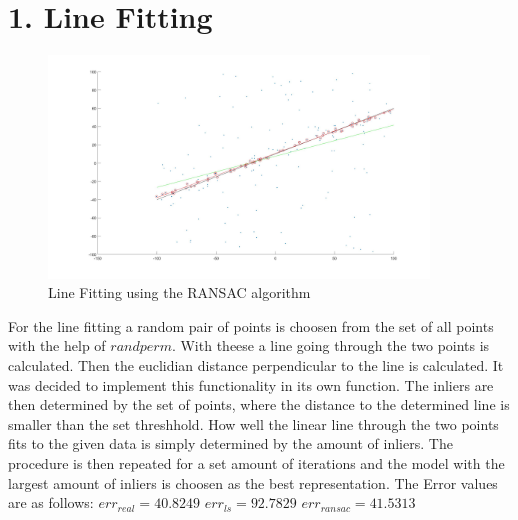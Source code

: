 \documentclass[12pt]{article}
\begin{document}
\maketitle


\section{1. Line Fitting}

\vspace{5mm}
\newline
\begin{figure}[ht]
	\centering
	\includegraphics[width=0.9\textwidth]{ransac.jpg}
	\caption{Line Fitting using the RANSAC algorithm}
	\label{fig1}
\end{figure}
\vspace{5mm}
\newline

For the line fitting a random pair of points is choosen from the set of all points with the help of $randperm$. With theese a line going through the two points is calculated. 
\newline
Then the euclidian distance perpendicular to the line is calculated. It was decided to implement this functionality in its own function. 
The inliers are then determined by the set of points, where the distance to the determined line is smaller than the set threshhold. How well the linear line through the two points fits to the given data is simply determined by the amount of inliers. The procedure is then repeated for a set amount of iterations and the model with the largest amount of inliers is choosen as the best representation.  
\newline
The Error values are as follows:
\vspace{5mm}
\newline
$err_{real} = 40.8249$
\vspace{5mm}
\newline
$err_{ls} = 92.7829$
\vspace{5mm}
\newline
$err_{ransac} =41.5313$
\vspace{5mm}
\newline
\end{document}
